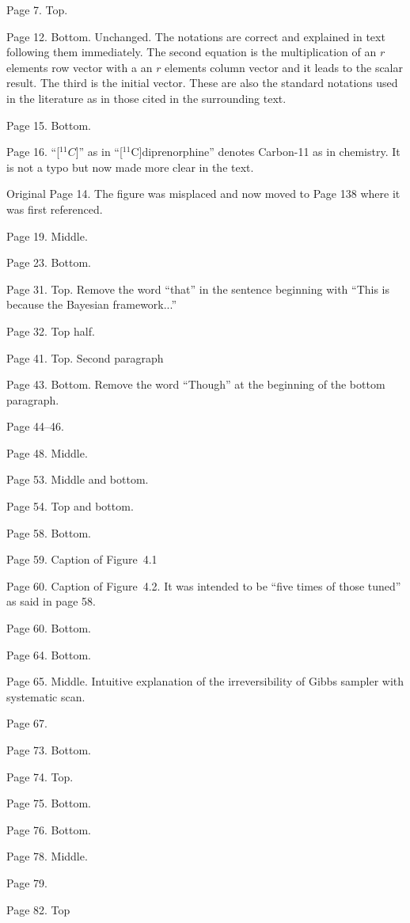 \documentclass[11pt, fontset=Scala]{marticle}
\begin{document}
Page 7. Top.

Page 12. Bottom. Unchanged. The notations are correct and explained in text following them immediately. The second equation is the multiplication of an $r$ elements row vector with a an $r$ elements column vector and it leads to the scalar result. The third is the initial vector. These are also the standard notations used in the  literature as in those cited in the surrounding text.

Page 15. Bottom.

Page 16. ``[${}^{11}C$]'' as in ``[${}^{11}$C]diprenorphine'' denotes Carbon-11 as in chemistry. It is not a typo but now made more clear in the text.

Original Page 14. The figure was misplaced and now moved to Page 138 where it was first referenced.

Page 19. Middle.

Page 23. Bottom.

Page 31. Top. Remove the word ``that'' in the sentence beginning with ``This is because the Bayesian framework...''

Page 32. Top half.

Page 41. Top. Second paragraph

Page 43. Bottom. Remove the word ``Though'' at the beginning of the bottom paragraph.

Page 44--46.

Page 48. Middle.

Page 53. Middle and bottom.

Page 54. Top and bottom.

Page 58. Bottom.

Page 59. Caption of Figure~4.1

Page 60. Caption of Figure~4.2. It was intended to be ``five times of those tuned'' as said in page 58.

Page 60. Bottom.

Page 64. Bottom.

Page 65. Middle. Intuitive explanation of the irreversibility of Gibbs sampler with systematic scan.

Page 67.

Page 73. Bottom.

Page 74. Top.

Page 75. Bottom.

Page 76. Bottom.

Page 78. Middle.

Page 79.

Page 82. Top
\end{document}
